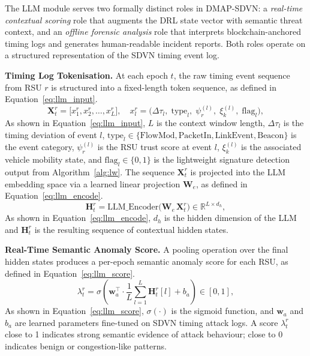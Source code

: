 The LLM module serves two formally distinct roles in DMAP-SDVN:
a \emph{real-time contextual scoring} role that augments the DRL
state vector with semantic threat context, and an \emph{offline
forensic analysis} role that interprets blockchain-anchored timing
logs and generates human-readable incident reports. Both roles
operate on a structured representation of the SDVN timing event
log.

\textbf{Timing Log Tokenisation.}
At each epoch $t$, the raw timing event sequence from RSU $r$
is structured into a fixed-length token sequence, as defined
in Equation~\eqref{eq:llm_input}.
\begin{equation}
\mathbf{X}_t^r = \bigl[
  x_1^r, x_2^r, \ldots, x_L^r
\bigr],
\quad
x_l^r = \bigl(
  \Delta\tau_l,\;
  \mathrm{type}_l,\;
  \psi_r^{(l)},\;
  \xi_k^{(l)},\;
  \mathrm{flag}_l
\bigr),
\label{eq:llm_input}
\end{equation}
As shown in Equation~\eqref{eq:llm_input}, $L$ is the context
window length, $\Delta\tau_l$ is the timing deviation of event
$l$, $\mathrm{type}_l \in \{\mathrm{FlowMod},
\mathrm{PacketIn}, \mathrm{LinkEvent}, \mathrm{Beacon}\}$ is
the event category, $\psi_r^{(l)}$ is the RSU trust score at
event $l$, $\xi_k^{(l)}$ is the associated vehicle mobility
state, and $\mathrm{flag}_l \in \{0,1\}$ is the lightweight
signature detection output from Algorithm~\ref{alg:lw}. The sequence $\mathbf{X}_t^r$ is projected into the LLM
embedding space via a learned linear projection $\mathbf{W}_e$,
as defined in Equation~\eqref{eq:llm_encode}.
\begin{equation}
\mathbf{H}_t^r = \mathrm{LLM\_Encoder}
  \bigl(\mathbf{W}_e\,\mathbf{X}_t^r\bigr)
  \in \mathbb{R}^{L \times d_h},
\label{eq:llm_encode}
\end{equation}
As shown in Equation~\eqref{eq:llm_encode}, $d_h$ is the
hidden dimension of the LLM and $\mathbf{H}_t^r$ is the
resulting sequence of contextual hidden states.

\textbf{Real-Time Semantic Anomaly Score.}
A pooling operation over the final hidden states produces a
per-epoch semantic anomaly score for each RSU, as defined in
Equation~\eqref{eq:llm_score}.
\begin{equation}
\lambda_t^r = \sigma\!\left(
  \mathbf{w}_a^\top \cdot
  \frac{1}{L}\sum_{l=1}^{L} \mathbf{H}_t^r[l]
  + b_a
\right) \in [0,1],
\label{eq:llm_score}
\end{equation}
As shown in Equation~\eqref{eq:llm_score}, $\sigma(\cdot)$
is the sigmoid function, and $\mathbf{w}_a$ and $b_a$ are
learned parameters fine-tuned on SDVN timing attack logs. A score $\lambda_t^r$ close to 1 indicates
strong semantic evidence of attack behaviour; close to 0
indicates benign or congestion-like patterns.

